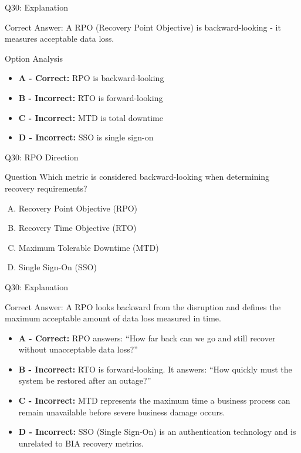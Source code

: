 \documentclass{beamer}
\begin{document}
	\begin{frame}{Q30: Explanation}
		\begin{block}{Correct Answer: A}
			RPO (Recovery Point Objective) is backward-looking - it measures acceptable data loss.
		\end{block}
		\begin{block}{Option Analysis}
			\begin{itemize}
				\item \textbf{A - Correct:} RPO is backward-looking
				\item \textbf{B - Incorrect:} RTO is forward-looking
				\item \textbf{C - Incorrect:} MTD is total downtime
				\item \textbf{D - Incorrect:} SSO is single sign-on
			\end{itemize}
		\end{block}
	\end{frame}
	
	
	\begin{frame}{Q30: RPO Direction} \begin{block}{Question} Which metric is considered backward-looking when determining recovery requirements? \end{block} \begin{enumerate}[(A)] \item Recovery Point Objective (RPO) \item Recovery Time Objective (RTO) \item Maximum Tolerable Downtime (MTD) \item Single Sign-On (SSO) \end{enumerate} \end{frame} \begin{frame}{Q30: Explanation} \begin{block}{Correct Answer: A} RPO looks backward from the disruption and defines the maximum acceptable amount of data loss measured in time. \end{block} \begin{itemize} \item \textbf{A - Correct:} RPO answers: ``How far back can we go and still recover without unacceptable data loss?'' \item \textbf{B - Incorrect:} RTO is forward-looking. It answers: ``How quickly must the system be restored after an outage?'' \item \textbf{C - Incorrect:} MTD represents the maximum time a business process can remain unavailable before severe business damage occurs. \item \textbf{D - Incorrect:} SSO (Single Sign-On) is an authentication technology and is unrelated to BIA recovery metrics. \end{itemize} \end{frame}
	
\end{document}
